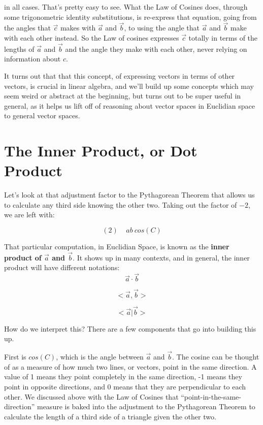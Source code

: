 \documentclass[
]{book}
\begin{document}
in all cases. That's pretty easy to see. What the Law of Cosines does, through some trigonometric identity substitutions, is re-express that equation, going from the angles that \(\vec{c}\) makes with \(\vec{a}\) and \(\vec{b}\), to using the angle that \(\vec{a}\) and \(\vec{b}\) make with each other instead. So the Law of cosines expresses \(\vec{c}\) totally in terms of the lengths of \(\vec{a}\) and \(\vec{b}\) and the angle they make with each other, never relying on information about \(c\).

It turns out that that this concept, of expressing vectors in terms of other vectors, is crucial in linear algebra, and we'll build up some concepts which may seem weird or abstract at the beginning, but turns out to be super useful in general, as it helps us lift off of reasoning about vector spaces in Euclidian space to general vector spaces.

\hypertarget{the-inner-product-or-dot-product}{%
\section{The Inner Product, or Dot Product}\label{the-inner-product-or-dot-product}}

Let's look at that adjustment factor to the Pythagorean Theorem that allows us to calculate any third side knowing the other two. Taking out the factor of \(-2\), we are left with:

\[(2) \ \ \ \ \ a b \ cos(C)\]

That particular computation, in Euclidian Space, is known as the \textbf{inner product of \(\vec{a}\) and \(\vec{b}\)}. It shows up in many contexts, and in general, the inner product will have different notations:
\[\vec{a} \cdot \vec{b}\]

\[ <\vec{a}, \vec{b}>\]

\[ <\vec{a}|\vec{b}>\]

How do we interpret this? There are a few components that go into building this up.

First is \(cos(C)\), which is the angle between \(\vec{a}\) and \(\vec{b}\). The cosine can be thought of as a measure of how much two lines, or vectors, point in the same direction. A value of 1 means they point completely in the same direction, -1 means they point in opposite directions, and 0 means that they are perpendicular to each other. We discussed above with the Law of Cosines that ``point-in-the-same-direction'' measure is baked into the adjustment to the Pythagorean Theorem to calculate the length of a third side of a triangle given the other two.
\end{document}
